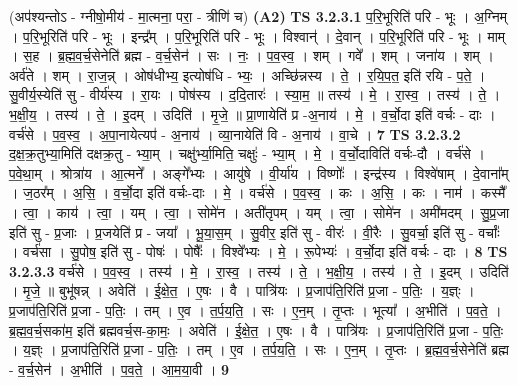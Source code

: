 \documentclass[17pt]{extarticle}
\begin{document}
                  \newline
                      (अप॑श्यन्तोऽ - ग्नीषो॒मीय॑ - मा॒त्मना॒ परा॒ - त्रीणि॑ च)  \textbf{(A2)} \newline \newline
                                \textbf{ TS 3.2.3.1} \newline
                  प॒रि॒भूरिति॑ परि - भूः । अ॒ग्निम् । प॒रि॒भूरिति॑ परि - भूः । इन्द्र᳚म् । प॒रि॒भूरिति॑ परि - भूः । विश्वान्॑ । दे॒वान् । प॒रि॒भूरिति॑ परि - भूः । माम् । स॒ह । ब्र॒ह्म॒व॒र्च॒सेनेति॑ ब्रह्म - व॒र्च॒सेन॑ । सः । नः॒ । प॒व॒स्व॒ । शम् । गवे᳚ । शम् । जना॑य । शम् । अर्व॑ते । शम् । रा॒ज॒न्न् । ओष॑धीभ्य॒ इत्योष॑धि - भ्यः॒ । अच्छि॑न्नस्य । ते॒ । र॒यि॒प॒त॒ इति॑ रयि - प॒ते॒ । सु॒वीर्य॒स्येति॑ सु - वीर्य॑स्य । रा॒यः । पोष॑स्य । द॒दि॒तारः॑ । स्या॒म॒ ॥ तस्य॑ । मे॒ । रा॒स्व॒ । तस्य॑ । ते॒ । भ॒क्षी॒य॒ । तस्य॑ । ते॒ । इ॒दम् । उदिति॑ । मृ॒जे॒ ॥ प्रा॒णायेति॑ प्र -अ॒नाय॑ । मे॒ । व॒र्चो॒दा इति॑ वर्चः - दाः । वर्च॑से । प॒व॒स्व॒ । अ॒पा॒नायेत्यप॑ - अ॒नाय॑ । व्या॒नायेति॑ वि - अ॒नाय॑ । वा॒चे । \textbf{  7} \newline
                  \newline
                                \textbf{ TS 3.2.3.2} \newline
                  द॒क्ष॒क्र॒तुभ्या॒मिति॑ दक्षक्र॒तु - भ्या॒म् । चक्षु॑र्भ्या॒मिति॒ चक्षुः॑ - भ्या॒म् । मे॒ । व॒र्चो॒दाविति॑ वर्चः-दौ । वर्च॑से । प॒वे॒था॒म् । श्रोत्रा॑य । आ॒त्मने᳚ । अङ्गे᳚भ्यः । आयु॑षे । वी॒र्या॑य । विष्णोः᳚ । इन्द्र॑स्य । विश्वे॑षाम् । दे॒वाना᳚म् । ज॒ठर᳚म् । अ॒सि॒ । व॒र्चो॒दा इति॑ वर्चः-दाः । मे॒ । वर्च॑से । प॒व॒स्व॒ । कः । अ॒सि॒ । कः । नाम॑ । कस्मै᳚ । त्वा॒ । काय॑ । त्वा॒ । यम् । त्वा॒ । सोमे॑न । अती॑तृपम् । यम् । त्वा॒ । सोमे॑न । अमी॑मदम् । सु॒प्र॒जा इति॑ सु - प्र॒जाः । प्र॒जयेति॑ प्र - जया᳚ । भू॒या॒स॒म् । सु॒वीर॒ इति॑ सु - वीरः॑ । वी॒रैः । सु॒वर्चा॒ इति॑ सु - वर्चाः᳚ । वर्च॑सा । सु॒पोष॒ इति॑ सु - पोषः॑ । पोषैः᳚ । विश्वे᳚भ्यः । मे॒ । रू॒पेभ्यः॑ । व॒र्चो॒दा इति॑ वर्चः - दाः । \textbf{  8} \newline
                  \newline
                                \textbf{ TS 3.2.3.3} \newline
                  वर्च॑से । प॒व॒स्व॒ । तस्य॑ । मे॒ । रा॒स्व॒ । तस्य॑ । ते॒ । भ॒क्षी॒य॒ । तस्य॑ । ते॒ । इ॒दम् । उदिति॑ । मृ॒जे॒ ॥ बुभू॑षन्न् । अवेति॑ । ई॒क्षे॒त॒ । ए॒षः । वै । पात्रि॑यः । प्र॒जाप॑ति॒रिति॑ प्र॒जा - प॒तिः॒ । य॒ज्ञ्ः । प्र॒जाप॑ति॒रिति॑ प्र॒जा - प॒तिः॒ । तम् । ए॒व । त॒र्प॒य॒ति॒ । सः । ए॒न॒म् । तृ॒प्तः । भूत्या᳚ । अ॒भीति॑ । प॒व॒ते॒ । ब्र॒ह्म॒व॒र्च॒सका॑म॒ इति॑ ब्रह्मवर्च॒स-का॒मः॒ । अवेति॑ । ई॒क्षे॒त॒ । ए॒षः । वै । पात्रि॑यः । प्र॒जाप॑ति॒रिति॑ प्र॒जा - प॒तिः॒ । य॒ज्ञ्ः । प्र॒जाप॑ति॒रिति॑ प्र॒जा - प॒तिः॒ । तम् । ए॒व । त॒र्प॒य॒ति॒ । सः । ए॒न॒म् । तृ॒प्तः । ब्र॒ह्म॒व॒र्च॒सेनेति॑ ब्रह्म - व॒र्च॒सेन॑ । अ॒भीति॑ । प॒व॒ते॒ । आ॒म॒या॒वी । \textbf{  9} \newline
\end{document}
